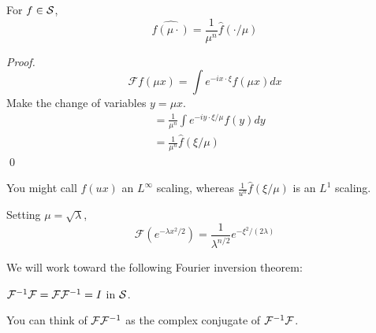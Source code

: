 \begin{proposition}
For $f\in \mathcal{S}$, 
\[
    \widehat{f(\mu \cdot)}=\frac{1}{\mu^{n}} \widehat{f}(\cdot / \mu)
\]
\end{proposition}
\begin{proof}
    $$
    \mathcal{F} f(\mu x)=\int e^{-i x \cdot \xi} f(\mu x) d x
    $$
    Make the change of variables $y=\mu x$.
    $$
    \begin{aligned}
    &=\frac{1}{\mu^{n}} \int e^{-i y \cdot \xi / \mu} f(y) d y \\
    &=\frac{1}{\mu^{n}} \widehat{f}(\xi / \mu)
    \end{aligned}
    $$
    \qed  
\end{proof}
\begin{remark}
You might call $f(ux)$ an $L^\infty$ scaling, whereas $\frac{1}{u^n}\hat f(\xi/\mu)$ is an $L^1$ scaling.
\end{remark}

\begin{example}
    Setting $\mu=\sqrt{\lambda}$,
$$
\mathcal{F}\left(e^{-\lambda x^{2} / 2}\right)=\frac{1}{\lambda^{n / 2}} e^{-\xi^{2} /(2 \lambda)}
$$
\end{example}
We will work toward the following Fourier inversion theorem:
\begin{theorem}
    $\mathcal{F}^{-1}\mathcal{F} = \mathcal{F} \mathcal{F}^{-1} = I$ in $\mathcal{S}$.
\end{theorem}
\begin{remark}
    You can think of $\mathcal{F}\mathcal{F}^{-1}$ as the complex conjugate of $\mathcal{F}^{-1} \mathcal{F}$.
\end{remark}